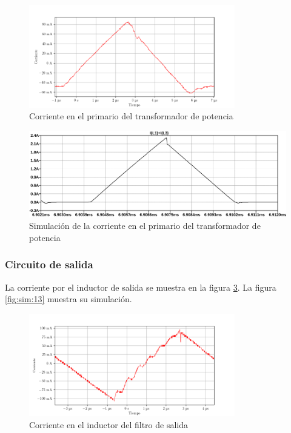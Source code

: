 \begin{figure}[H]
    \centering
    \includegraphics[width=0.8\textwidth]{images/capturas-osciloscopio/17-11-2022/24.png}
    \caption{Corriente en el primario del transformador de potencia}
    \label{fig:osc:24}
\end{figure}

\begin{figure}[H]
    \centering
    \includegraphics[width=\textwidth]{images/sim/12.pdf}
    \caption{Simulación de la corriente en el primario del transformador de potencia}
    \label{fig:sim:12}
\end{figure}

\subsubsection{Circuito de salida}

La corriente por el inductor de salida se muestra en la figura \ref{fig:osc:66}. La figura \ref{fig:sim:13} muestra su simulación.

\begin{figure}[H]
    \centering
    \includegraphics[width=0.8\textwidth]{images/capturas-osciloscopio/17-11-2022/66.png}
    \caption{Corriente en el inductor del filtro de salida}
    \label{fig:osc:66}
\end{figure}

